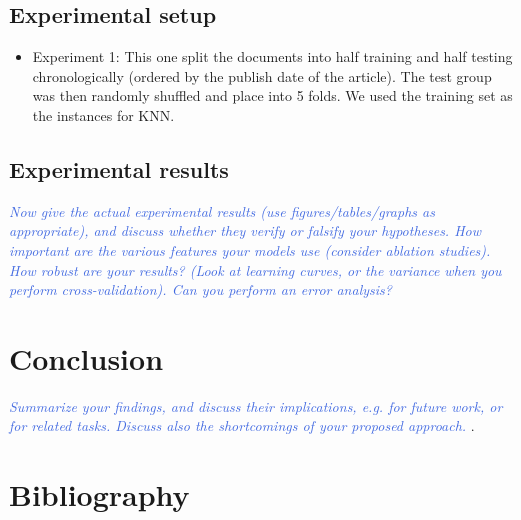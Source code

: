 \documentclass[11pt,letterpaper]{article}
\newcommand{\blue}[1]{\textcolor{RoyalBlue}{#1}}
\newcommand{\instructions}[1]{\blue{\textit{#1}}}
\begin{document}
\subsection{Experimental setup}
\label{sec:experimental-setup}
\begin{itemize}
  \item Experiment 1: This one split the documents into half training and half testing
  chronologically (ordered by the publish date of the article). The test group
  was then randomly shuffled and place into 5 folds. We used the training set as the
  instances for KNN.
\end{itemize}

\subsection{Experimental results}
\label{sec:experimental-results}
\instructions{Now give the actual experimental results (use figures/tables/graphs as appropriate), and discuss whether they verify or falsify your hypotheses. How important are the various features your models use (consider ablation studies). How robust are your results? (Look at learning curves, or the variance when you perform cross-validation). Can you perform an error analysis?}

\section{Conclusion}
\instructions{Summarize your findings, and discuss their implications, e.g. for future work, or for related tasks. Discuss also the shortcomings of your proposed approach. }. 


\section*{Bibliography}
{}

\end{document}
